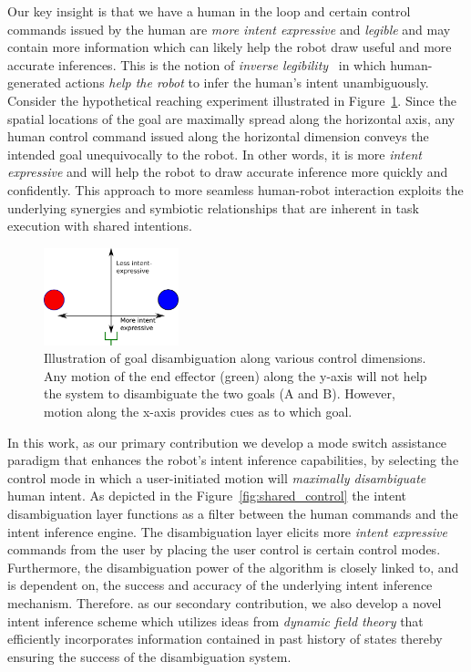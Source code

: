 Our key insight is that we have a human in the loop and certain control commands issued by the human are \textit{more intent expressive} and \textit{legible} and may contain more information which can likely help the robot draw useful and more accurate inferences. This is the notion of \textit{inverse legibility}~\cite{gopinath2017mode} in which human-generated actions \textit{help the robot} to infer the human's intent unambiguously. Consider the hypothetical reaching experiment illustrated in Figure~\ref{fig:disamb}. Since the spatial locations of the goal are maximally spread along the horizontal axis, any human control command issued along the horizontal dimension conveys the intended goal unequivocally to the robot. In other words, it is more \textit{intent expressive} and will help the robot to draw accurate inference more quickly and confidently. This approach to more seamless human-robot interaction exploits the underlying synergies and symbiotic relationships that are inherent in task execution with shared intentions. 
\begin{figure}
	\begin{center}
		\includegraphics[width=0.35\textwidth]{./figures/Fig1_Disamb.eps}
	\end{center}
	\caption{Illustration of goal disambiguation along various control dimensions. Any motion of the end effector (green) along the y-axis will not help the system to disambiguate the two goals (A and B). However, motion along the x-axis provides cues as to which goal.}
	\label{fig:disamb}
\end{figure}

In this work, as our primary contribution we develop a mode switch assistance paradigm that enhances the robot's intent inference capabilities, by selecting the control mode in which a user-initiated motion will \textit{maximally disambiguate} human intent. As depicted in the Figure~\ref{fig:shared_control} the intent disambiguation layer functions as a filter between the human commands and the intent inference engine. The disambiguation layer elicits more \textit{intent expressive} commands from the user by placing the user control is certain control modes. Furthermore, the disambiguation power of the algorithm is closely linked to, and is dependent on, the success and accuracy of the underlying intent inference mechanism. Therefore. as our secondary contribution, we also develop a novel intent inference scheme which utilizes ideas from \textit{dynamic field theory} that efficiently incorporates information contained in past history of states thereby ensuring the success of the disambiguation system. 

